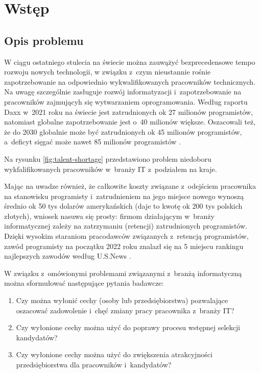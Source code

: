
\chapter*{Wstęp}\label{ch:admission}

\section*{Opis problemu}\label{sec:admission:problem-description}

W ciągu ostatniego stulecia na świecie można zauwążyć bezprecedensowe tempo rozwoju nowych technologii,
w związku z~czym nieustannie rośnie zapotrzebowanie na odpowiednio wykwalifikowanych pracowników technicznych.
Na uwagę szczególnie zasługuje rozwój informatyzacji i~zapotrzebowanie na pracowników zajmującyh się wytwarzaniem oprogramowania.
Według raportu Daxx w~2021 roku na świecie jest zatrudnionych ok 27 milionów programistów, natomiast globalne zapotrzebowanie jest o~40 milionów większe.
Oszacowali też, że do 2030 globalnie może być zatrudnionych ok 45 milionów programistów, a~deficyt sięgać może nawet 85 milionów programistów \cite{daxx-2021}.

Na rysunku \ref{fig:talent-shortage} przedstawiono problem niedoboru wykfalifikowanych pracowników w~branży IT z~podziałem na kraje.


Mając na uwadze również, że całkowite koszty związane z~odejściem pracownika na stanowisku programisty i~zatrudnieniem na jego miejsce nowego
wynoszą średnio ok 50 tys dolarów amerykańskich \cite{hairing-dev-2021} (daje to kwotę ok 200 tys polskich złotych), wniosek nasuwa się prosty:
firmom działającym w~branży informatycznej zależy na zatrzymaniu (retencji) zatrudnionych programistów.
Dzięki wysokim staraniom pracodawców związanych z~retencją programistów,
zawód programisty na początku 2022 roku znalazł się na 5 miejscu rankingu najlepszych zawodów według U.S.News \cite{us-news-2022}.

W związku z~omówionymi problemami związanymi z~branżą informatyczną można sformułować następujące pytania badawcze:
\begin{enumerate}
    \item Czy można wyłonić cechy (osoby lub przedsiębiorstwa) pozwalające oszacować zadowolenie i~chęć zmiany pracy pracownika z~branży IT?
    \item Czy wyłonione cechy można użyć do poprawy procesu wstępnej selekcji kandydatów?
    \item Czy wyłonione cechy można użyć do zwiększenia atrakcyjności przedsiębiorstwa dla pracowników i~kandydatów?
\end{enumerate}

